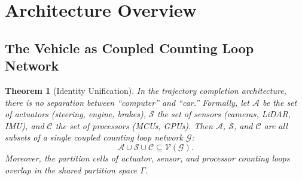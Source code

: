 \documentclass[twocolumn,10pt]{article}
\newtheorem{theorem}{Theorem}[section]
\theoremstyle{definition}
\begin{document}
\section{Architecture Overview}
\label{sec:architecture}

\subsection{The Vehicle as Coupled Counting Loop Network}

\begin{theorem}[Identity Unification]
\label{thm:identity-unification}
In the trajectory completion architecture, there is no separation between ``computer'' and ``car.'' Formally, let $\mathcal{A}$ be the set of actuators (steering, engine, brakes), $\mathcal{S}$ the set of sensors (cameras, LiDAR, IMU), and $\mathcal{C}$ the set of processors (MCUs, GPUs). Then $\mathcal{A}$, $\mathcal{S}$, and $\mathcal{C}$ are all subsets of a single coupled counting loop network $\mathcal{G}$:
\begin{equation}
\mathcal{A} \cup \mathcal{S} \cup \mathcal{C} \subseteq \mathcal{V}(\mathcal{G}).
\end{equation}
Moreover, the partition cells of actuator, sensor, and processor counting loops overlap in the shared partition space $\Gamma$.
\end{theorem}
\end{document}
